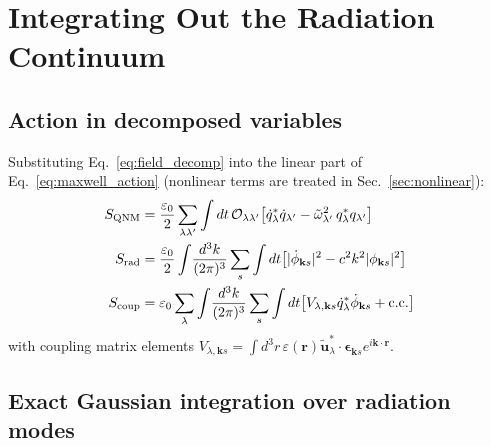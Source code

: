 \documentclass[12pt]{article}
\newcommand{\rad}{{\rm rad}}
\newcommand{\QNM}{{\rm QNM}}
\newcommand{\tu}{\tilde{\mathbf{u}}}
\newcommand{\tomega}{\tilde{\omega}}
\begin{document}
\section{Integrating Out the Radiation Continuum}
\label{sec:radiation}

\subsection{Action in decomposed variables}

Substituting Eq.~\eqref{eq:field_decomp} into the linear part of
Eq.~\eqref{eq:maxwell_action} (nonlinear terms are treated in
Sec.~\ref{sec:nonlinear}):
\begin{align}
  S_\QNM &= \frac{\varepsilon_0}{2}\sum_{\lambda\lambda'}\int dt\,
  \mathcal{O}_{\lambda\lambda'}\bigl[\dot{q}_\lambda^*\dot{q}_{\lambda'}
  -\tomega_{\lambda'}^2\,q_\lambda^*q_{\lambda'}\bigr]
  \label{eq:S_QNM}\\
  S_\rad &= \frac{\varepsilon_0}{2}\int\!\frac{d^3k}{(2\pi)^3}\sum_s
  \int dt\bigl[|\dot{\phi}_{\mathbf{k}s}|^2-c^2k^2|\phi_{\mathbf{k}s}|^2\bigr]
  \label{eq:S_rad}\\
  S_{\rm coup} &= \varepsilon_0\sum_\lambda\int\!\frac{d^3k}{(2\pi)^3}\sum_s
  \int dt\bigl[V_{\lambda,\mathbf{k}s}\dot{q}_\lambda^*\dot{\phi}_{\mathbf{k}s}
  +\mathrm{c.c.}\bigr]
  \label{eq:S_coup}
\end{align}
with coupling matrix elements
$V_{\lambda,\mathbf{k}s}=\int d^3r\,\varepsilon(\mathbf{r})
\tu_\lambda^*\cdot\boldsymbol{\epsilon}_{\mathbf{k}s}e^{i\mathbf{k}\cdot\mathbf{r}}$.

\subsection{Exact Gaussian integration over radiation modes}
\end{document}
